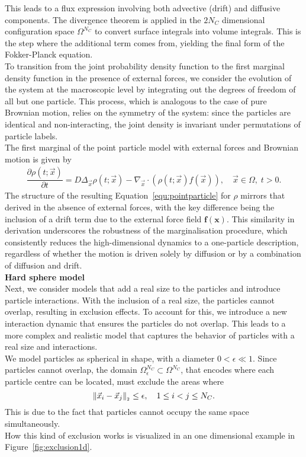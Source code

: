 This leads to a flux expression involving both advective (drift) and diffusive components. 
The divergence theorem is applied in the $2 N_C$ dimensional configuration space $\Omega^{N_C}$ to convert surface integrals into volume integrals.
This is the step where the additional term comes from, yielding the final form of the Fokker-Planck equation. \\
To transition from the joint probability density function to the first marginal density function in the presence of external forces, we consider the evolution of the system at the macroscopic level by integrating out the degrees of freedom of all but one particle. 
This process, which is analogous to the case of pure Brownian motion, relies on the symmetry of the system: since the particles are identical and non-interacting, the joint density is invariant under permutations of particle labels. \\
The first marginal of the point particle model with external forces and Brownian motion is given by 
\begin{align}
	\dfrac{\partial \rho (t; \vec{x})}{\partial t} = D \Delta_{\vec{x}} \rho(t; \vec{x}) - \nabla_{\vec{x}} \cdot (\rho(t; \vec{x}) f(\vec{x}) ), \quad \vec{x} \in \Omega, \; t>0.
	\label{equ:pointparticle}
\end{align}
The structure of the resulting Equation~\eqref{equ:pointparticle} for $\rho$ mirrors that derived in the absence of external forces, with the key difference being the inclusion of a drift term due to the external force field $\mathbf{f}(\mathbf{x})$. 
This similarity in derivation underscores the robustness of the marginalisation procedure, which consistently reduces the high-dimensional dynamics to a one-particle description, regardless of whether the motion is driven solely by diffusion or by a combination of diffusion and drift. \\


\textbf{Hard sphere model} \\
Next, we consider models that add a real size to the particles and introduce particle interactions. 
With the inclusion of a real size, the particles cannot overlap, resulting in exclusion effects. 
To account for this, we introduce a new interaction dynamic that ensures the particles do not overlap. 
This leads to a more complex and realistic model that captures the behavior of particles with a real size and interactions. \\
We model particles as spherical in shape, with a diameter $0 < \epsilon \ll 1$. 
Since particles cannot overlap, the domain $\Omega_{\epsilon}^{N_C} \subset \Omega^{N_C}$, that encodes where each particle centre can be located, must exclude the areas where \[ \norm[\vec{x}_i - \vec{x}_j] \leq \epsilon, \quad 1 \leq i < j \leq N_C.\] 
This is due to the fact that particles cannot occupy the same space simultaneously. \\
How this kind of exclusion works is visualized in an one dimensional example in Figure~\ref{fig:exclusion1d}.  

